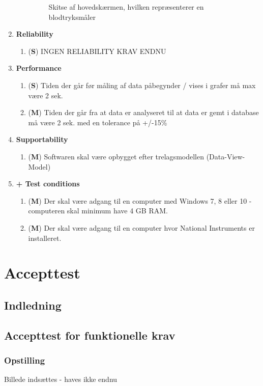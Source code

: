 \begin{enumerate}
\begin{enumerate}
\begin{figure}[h!]
\caption{Skitse af hovedskærmen, hvilken repræsenterer en blodtryksmåler}
\end{figure}
\end{enumerate}
\item \textbf{Reliability}
\begin{enumerate}
\item (\textbf{S}) INGEN RELIABILITY KRAV ENDNU
\end{enumerate}
\item \textbf{Performance}
\begin{enumerate}
\item (\textbf{S}) Tiden der går før måling af data påbegynder / vises i grafer må max være 2 sek.
\item (\textbf{M}) Tiden der går fra at data er analyseret til at data er gemt i database må være 2 sek. med en tolerance på +/-15\%  
\end{enumerate}
\item \textbf{Supportability}
\begin{enumerate}
\item (\textbf{M}) Softwaren skal være opbygget efter trelagsmodellen (Data-View-Model)
\end{enumerate}
\item \textbf{+ Test conditions}
\begin{enumerate}
\item (\textbf{M}) Der skal være adgang til en computer med Windows 7, 8 eller 10 - computeren skal minimum have 4 GB RAM.
\item (\textbf{M}) Der skal være adgang til en computer hvor National Instruments er installeret.
\end{enumerate}
\end{enumerate}

\chapter{Accepttest}
\section{Indledning}
\section{Accepttest for funktionelle krav}

\subsection{Opstilling}
Billede indsættes - haves ikke endnu

